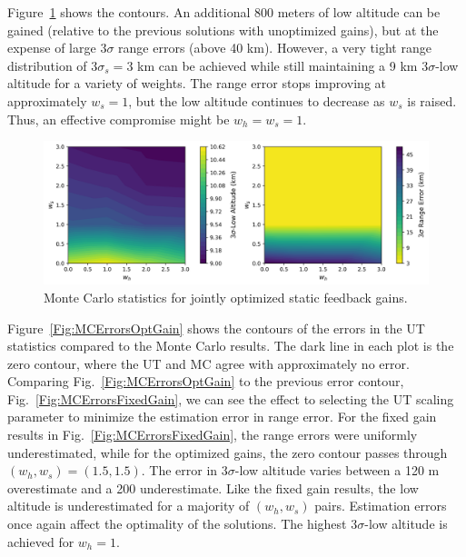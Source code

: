 Figure~\ref{Fig:MCResultsOptGain} shows the contours. An additional 800 meters of low altitude can be gained (relative to the previous solutions with unoptimized gains), but at the expense of large $3\sigma$ range errors (above 40 km). However, a very tight range distribution of $3\sigma_s = 3$ km can be achieved while still maintaining a 9 km 3$\sigma$-low altitude for a variety of weights. The range error stops improving at approximately $w_s=1$, but the low altitude continues to decrease as $w_s$ is raised. Thus, an effective compromise might be $w_h=w_s=1$. 
\begin{figure}[h!]
	\centering
	\includegraphics[width=1\textwidth]{Images/Reoptimized_WeightSweepMCResults}
	\caption{Monte Carlo statistics for jointly optimized static feedback gains.}
	\label{Fig:MCResultsOptGain}
\end{figure}
Figure~\ref{Fig:MCErrorsOptGain} shows the contours of the errors in the UT statistics compared to the Monte Carlo results. The dark line in each plot is the zero contour, where the UT and MC agree with approximately no error. Comparing Fig.~\ref{Fig:MCErrorsOptGain} to the previous error contour, Fig.~\ref{Fig:MCErrorsFixedGain}, we can see the effect to selecting the UT scaling parameter to minimize the estimation error in range error. For the fixed gain results in Fig.~\ref{Fig:MCErrorsFixedGain}, the range errors were uniformly underestimated, while for the optimized gains, the zero contour passes through $(w_h,w_s) = (1.5,1.5)$. 
The error in 3$\sigma$-low altitude varies between a 120 m overestimate and a 200 underestimate. Like the fixed gain results, the low altitude is underestimated for a majority of $(w_h,w_s)$ pairs. Estimation errors once again affect the optimality of the solutions. The highest 3$\sigma$-low altitude is achieved for $w_h=1$. 
